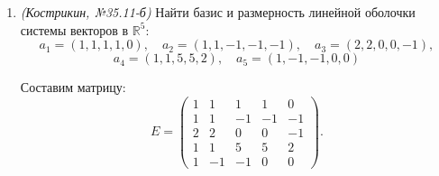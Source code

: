 \begin{enumerate}
Приведём матрицу к ступенчатому виду:
\[
\begin{pmatrix}
    1 & 0 & 0 & -1 \\
    2 & 1 & 1 & 0 \\
    1 & 1 & 1 & 1 \\
    1 & 2 & 3 & 4 \\
    0 & 1 & 2 & 3
\end{pmatrix}
\xrightarrow{\,\, (2)-2(1),\ (3)-(1),\ (4)-(1) \,\,}
\begin{pmatrix}
    1 & 0 & 0 & -1 \\
    0 & 1 & 1 & 2 \\
    0 & 1 & 1 & 2 \\
    0 & 1 & 2 & 3 \\
    0 & 1 & 2 & 3
\end{pmatrix}
\]
\[
\xrightarrow{\,\, (3)-(2),\ (4)-(2),\ (5)-(2) \,\,}
\begin{pmatrix}
    1 & 0 & 0 & -1 \\
    0 & 1 & 1 & 2 \\
    0 & 0 & 0 & 0 \\
    0 & 0 & 1 & 1 \\
    0 & 0 & 1 & 1
\end{pmatrix}
\xrightarrow{\,\, (5)-(4),\ перестановка строк \,\,}
\begin{pmatrix}
    1 & 0 & 0 & -1 \\
    0 & 1 & 1 & 2 \\
    0 & 0 & 1 & 1 \\
    0 & 0 & 0 & 0 \\
    0 & 0 & 0 & 0
\end{pmatrix}.
\]

Осталось 3 ненулевые строки, значит, ранг матрицы равен 3, и
\[
\dim L = 3.
\]

В качестве базиса можно взять векторы
\[
a_1,\ a_2,\ a_4.
\]

\item \textit{(Кострикин, №35.11-б)} Найти базис и размерность линейной оболочки системы векторов в $\mathbb{R}^5$:
\[
a_1 = (1, 1, 1, 1, 0), \quad a_2 = (1, 1, -1, -1, -1), \quad a_3 = (2, 2, 0, 0, -1),
\]
\[
a_4 = (1, 1, 5, 5, 2), \quad a_5 = (1, -1, -1, 0, 0)
\]

Составим матрицу:
\[
E =
\begin{pmatrix}
    1 & 1 & 1 & 1 & 0 \\
    1 & 1 & -1 & -1 & -1 \\
    2 & 2 & 0 & 0 & -1 \\
    1 & 1 & 5 & 5 & 2 \\
    1 & -1 & -1 & 0 & 0
\end{pmatrix}.
\]


\end{enumerate}

